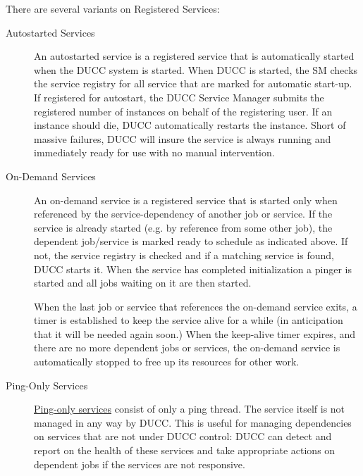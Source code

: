       There are several variants on Registered Services:
      \begin{description}

        \item[Autostarted Services] An autostarted service is a registered service that is
          automatically started when the DUCC system is started. When DUCC is started, the SM checks the
          service registry for all service that are marked for automatic start-up.  If registered for autostart,
          the DUCC Service Manager submits the registered number of instances
          on behalf of the registering user.  If an instance should die, DUCC automatically restarts
          the instance.  Short of massive failures, DUCC will insure the service is always running
          and immediately ready for use with no manual intervention.
          
        \item[On-Demand Services] An on-demand service is a registered service that is started only
          when referenced by the service-dependency of another job or service. If the service is
          already started (e.g. by reference from some other job), the dependent job/service is
          marked ready to schedule as indicated above. If not, the service registry is checked and
          if a matching service is found, DUCC starts it. When the service has completed
          initialization a pinger is started and all jobs waiting on it are then started.
          
          When the last job or service that references the on-demand service exits, a timer is
          established to keep the service alive for a while (in anticipation that it will be needed
          again soon.)  When the keep-alive timer expires, and there are no more dependent
          jobs or services, the on-demand service is automatically stopped to free up its resources for
          other work.

        \item[Ping-Only Services] 
          \label{subsub:services.ping-only}
          \hyperref[sec:services.implicit]{Ping-only services} consist of only
          a ping thread.  The service itself is not managed in any way by DUCC.  This is useful for
          managing dependencies on services that are not under DUCC control: DUCC can detect and
          report on the health of these services and take appropriate actions on dependent jobs if
          the services are not responsive.
      \end{description}
          
